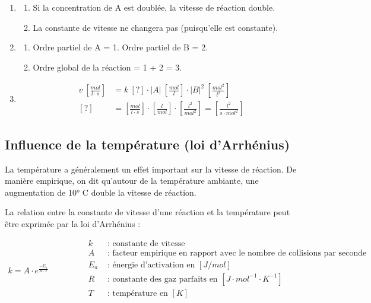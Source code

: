 \documentclass[
  11pt,
  french,
  a4paper,
  openany]{book}
\providecommand{\tightlist}{%
  \setlength{\itemsep}{0pt}\setlength{\parskip}{0pt}}
\begin{document}
\begin{Answer}

\begin{enumerate}
\def\labelenumi{\arabic{enumi}.}
\item
  \begin{enumerate}
  \def\labelenumii{\alph{enumii}.}
  \tightlist
  \item
    Si la concentration de A est doublée, la vitesse de réaction double.
  \item
    La constante de vitesse ne changera pas (puisqu'elle est constante).
  \end{enumerate}
\item
  \begin{enumerate}
  \def\labelenumii{\alph{enumii}.}
  \tightlist
  \item
    Ordre partiel de A = 1. Ordre partiel de B = 2.
  \item
    Ordre global de la réaction = 1 + 2 = 3.
  \end{enumerate}
\item
  \[
  \begin{split}
  v\ [\frac{mol}{l \cdot s}] &= k\ [?] \cdot |A|\ [\frac{mol}{l}] \cdot |B|^2 \ [\frac{mol^2}{l^2}] \\
  [?] &= [\frac{mol}{l \cdot s}] \cdot [\frac{l}{mol}] \cdot [\frac{l^2}{mol^2}] = [\frac{l^2}{s \cdot mol^2}]
  \end{split}
  \]
\end{enumerate}


\end{Answer}

\newpage

\hypertarget{influence-de-la-tempuxe9rature-loi-darrhuxe9nius}{%
\subsection{Influence de la température (loi d'Arrhénius)}\label{influence-de-la-tempuxe9rature-loi-darrhuxe9nius}}

La température a généralement un effet important sur la vitesse de réaction. De manière empirique, on dit qu'autour de la température ambiante, une augmentation de 10° C double la vitesse de réaction.

La relation entre la constante de vitesse d'une réaction et la température peut être exprimée par la loi d'Arrhénius :

\[
\begin{split}
k = A \cdot e^{\frac{-E_a}{R \cdot T}}
\end{split}
\qquad\qquad
\begin{split}
k &\text{ : constante de vitesse} \\
A &\text{ : facteur empirique en rapport avec le nombre de collisions par seconde } \\
E_a &\text{ : énergie d'activation en } [J/mol] \\
R &\text{ : constante des gaz parfaits en } [J \cdot mol^{-1} \cdot K^{-1}] \\
T &\text{ : température en } [K]
\end{split}
\]
\end{document}
